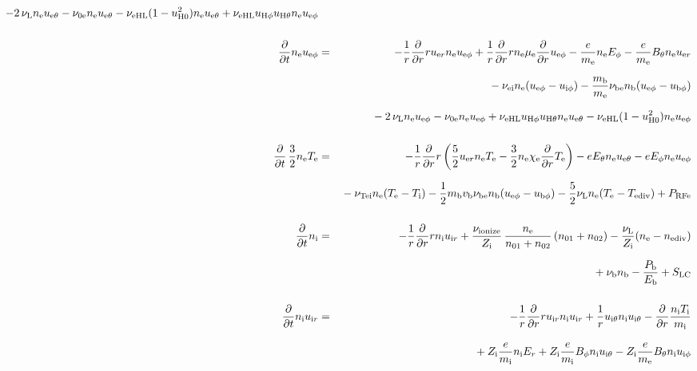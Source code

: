 \documentclass[11pt]{article}
\def\r#1{{\rm#1}}
\def\ddt{\frac{\partial}{\partial t}}
\def\ddr{\frac{\partial}{\partial r}}
\def\me{m_\r{e}}
\def\mi{m_\r{i}}
\def\mb{m_\r{b}}
\def\mue{\mu_\r{e}}
\def\mui{\mu_\r{i}}
\def\De{D_\r{e}}
\def\Di{D_\r{i}}
\def\chie{\chi_\r{e}}
\def\ne{n_\r{e}}
\def\ni{n_\r{i}}
\def\nb{n_\r{b}}
\def\uer{u_{\r{e}r}}
\def\uir{u_{\r{i}r}}
\def\ueth{u_{\r{e}\theta}}
\def\uith{u_{\r{i}\theta}}
\def\ueph{u_{\r{e}\phi}}
\def\uiph{u_{\r{i}\phi}}
\def\ubph{u_{\r{b}\phi}}
\def\Er{E_r}
\def\Eth{E_\theta}
\def\Eph{E_\phi}
\def\Bth{B_\theta}
\def\Bph{B_\phi}
\def\Te{T_\r{e}}
\def\Ti{T_\r{i}}
\def\nna{n_{01}}
\def\nnb{n_{02}}
\def\Zi{Z_\r{i}}
\def\Pb{P_\r{b}}
\def\Eb{E_\r{b}}
\def\PRFe{P_\r{RFe}}
\def\nuei{\nu_\r{ei}}
\def\nube{\nu_\r{be}}
\def\nune{\nu_\r{0e}}
\def\nuL{\nu_\r{L}}
\def\nuion{\nu_\r{ionize}}
\def\nub{\nu_\r{b}}
\def\nuTei{\nu_\r{Tei}}
\def\vb{v_\r{b}}
\def\nediv{n_\r{ediv}}
\def\Tediv{T_\r{ediv}}
\newcommand{\Frac}[2]{%
  {\displaystyle {\displaystyle #1\over \displaystyle #2}}%
}
\newcommand{\rdprd}[2]{\Frac{\partial #1}{\partial #2}}
\newcommand{\aveaveB}[1]{\left< \!\! \left< #1 \right> \!\! \right>}
\begin{document}
\begin{eqnarray}
%
  - 2\, \nuL \ne \ueth
%
  - \nune \ne \ueth
%
  - \nu_\r{eHL} (1 - u_\r{H0}^2) \ne \ueth
%
  + \nu_\r{eHL} u_{\r{H}\phi} u_{\r{H}\theta} \ne \ueph
\\[5mm]
%
%
  \ddt \ne \ueph &=&
%
  - \frac{1}{r} \ddr r \uer \ne \ueph
%
  + \frac{1}{r} \ddr r \ne \mue \ddr \ueph
%
  - \frac{e}{\me} \ne \Eph
%
  - \frac{e}{\me} \Bth \ne \uer 
\nonumber\\[2.5mm]&&{}
%
  - \nuei \ne (\ueph - \uiph)
%
  - \frac{\mb}{\me} \nube \nb (\ueph - \ubph)
\nonumber\\[2.5mm]&&{}
%
  - 2\, \nuL \ne \ueph
%
  - \nune \ne \ueph
%
  + \nu_\r{eHL} u_{\r{H}\phi} u_{\r{H}\theta} \ne \ueth
%
  - \nu_\r{eHL} (1 - u_\r{H0}^2) \ne \ueph
\\[5mm]
%
%
  \ddt \, \frac{3}{2} \ne \Te &=&
%
 - \frac{1}{r} \ddr r
   \left( \frac{5}{2} \uer \ne \Te - \frac{3}{2} \ne \chie \ddr \Te \right)
%
  -  e \Eth \ne \ueth
%
  -  e \Eph \ne \ueph 
\nonumber\\[2.5mm]&&{}
%
  - \nuTei \ne (\Te - \Ti)
%
  - \frac{1}{2} \mb \vb \nube \nb (\ueph - \ubph)
%
  - \frac{5}{2} \nuL \ne (\Te - \Tediv)
%
  + \PRFe
\\[5mm]
%
%
  \ddt\ni &=&
%
  - \frac{1}{r} \ddr r \ni \uir
%
  + \frac{\nuion}{\Zi}\, \frac{\ne}{\nna+\nnb}\, (\nna+\nnb)
%
  - \frac{\nuL}{\Zi} (\ne - \nediv) 
\nonumber\\[2.5mm]&&{}
%
  + \nub \nb
%
  - \frac{\Pb}{\Eb}
%
  + S_\r{LC}
\\[5mm]
%
%
  \ddt \ni \uir &=&
%
  - \frac{1}{r} \ddr r \uir \ni \uir
%
  + \frac{1}{r} \uith \ni \uith
%
  - \ddr \frac{\ni \Ti}{\mi}
\nonumber\\[3mm]&&{}
%
  + \Zi \frac{e}{\mi}\ni \Er
%
  + \Zi \frac{e}{\mi} \Bph \ni \uith
%
  - \Zi \frac{e}{\me} \Bth \ni \uiph
\\[5mm]

\end{eqnarray}
\end{document}
